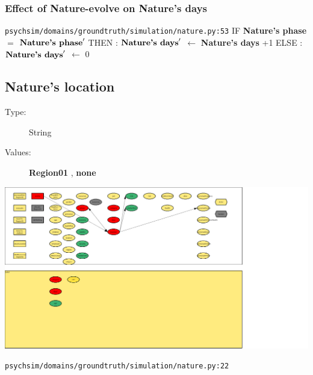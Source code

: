 \documentclass{article}%
\begin{document}
\subsubsection{Effect of Nature{-}evolve on Nature's days}%
\label{ssubsec:Effect of Nature{-}evolve on Nature's days}%
\begin{flushleft}%
\verb|psychsim/domains/groundtruth/simulation/nature.py:53|%
\linebreak%
IF %
\textbf{Nature's phase}%
$=$%
$\mbox{\textbf{Nature's phase}} '$%
\linebreak%
\hspace*{2em}%
THEN %
: %
$\mbox{\textbf{Nature's days}} '$%
$\leftarrow$%
\textbf{Nature's days}%
+1%
\linebreak%
\hspace*{2em}%
ELSE %
: %
$\mbox{\textbf{Nature's days}} '$%
$\leftarrow$%
0%
\end{flushleft}

%
\subsection{Nature's location}%
\label{subsec:Nature's location}%
\begin{description}%
\item[Type:]%
String%
\item[Values:]%
\textbf{Region01}%
, %
\textbf{none}%
\end{description}%
\includegraphics[width=\textwidth]{images/locationOfNature.png}%
\begin{flushleft}%
\verb|psychsim/domains/groundtruth/simulation/nature.py:22|%
\end{flushleft}%
\end{document}
